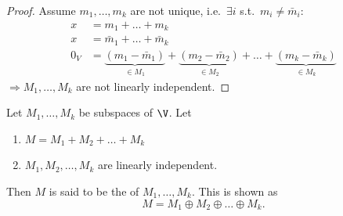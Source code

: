\begin{proof}
Assume $m_1,\dots,m_k$ are not unique, i.e.\ $\exists i$ s.t.\ $m_i\ne\bar m_i$:
\begin{align*}
x&=m_1+\dots+m_k\\
x&=\bar m_1+\dots+\bar m_k\\
0_V&=\underbrace{(m_1-\bar m_1)}_{\in M_1}+\underbrace{(m_2-\bar m_2)}_{\in M_2}+\dots+\underbrace{(m_k-\bar m_k)}_{\in M_k}
\end{align*}
$\Rightarrow M_1,\dots,M_k$ are not linearly independent. \qedhere
\end{proof}

\begin{definition}
Let $M_1,\dots,M_k$ be subspaces of $\V$. Let
\begin{enumerate}[label=\roman*-)]
\item $M=M_1+M_2+\dots+M_k$
\item $M_1,M_2,\dots,M_k$ are linearly independent.
\end{enumerate}
Then $M$ is said to be the  of $M_1,\dots,M_k$. This is shown as
\[
M=M_1\oplus M_2\oplus\dots\oplus M_k .
\]
\end{definition}

